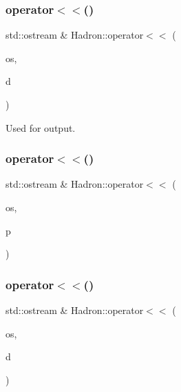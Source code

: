 \subsubsection{\texorpdfstring{operator$<$$<$()}{operator<<()}\hspace{0.1cm}{\footnotesize\ttfamily [36/48]}}
{\footnotesize\ttfamily std\+::ostream \& Hadron\+::operator$<$$<$ (\begin{DoxyParamCaption}\item[{std\+::ostream \&}]{os,  }\item[{const \mbox{\hyperlink{structHadron_1_1HadronVertex__t}{Hadron\+Vertex\+\_\+t}} \&}]{d }\end{DoxyParamCaption})}



Used for output. 

\mbox{\label{namespaceHadron_a7fed56ec5f5f96e9e160939d5b138184}} 
\subsubsection{\texorpdfstring{operator$<$$<$()}{operator<<()}\hspace{0.1cm}{\footnotesize\ttfamily [37/48]}}
{\footnotesize\ttfamily std\+::ostream \& Hadron\+::operator$<$$<$ (\begin{DoxyParamCaption}\item[{std\+::ostream \&}]{os,  }\item[{const \mbox{\hyperlink{structHadron_1_1HadronDiagramTimeSlices__t}{Hadron\+Diagram\+Time\+Slices\+\_\+t}} \&}]{p }\end{DoxyParamCaption})}

\mbox{\label{namespaceHadron_accc8a0a89713671c3a48ac45536eac45}} 
\subsubsection{\texorpdfstring{operator$<$$<$()}{operator<<()}\hspace{0.1cm}{\footnotesize\ttfamily [38/48]}}
{\footnotesize\ttfamily std\+::ostream \& Hadron\+::operator$<$$<$ (\begin{DoxyParamCaption}\item[{std\+::ostream \&}]{os,  }\item[{const \mbox{\hyperlink{structHadron_1_1KeyHadronNode__t}{Key\+Hadron\+Node\+\_\+t}} \&}]{d }\end{DoxyParamCaption})}



